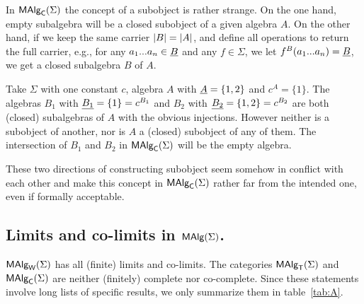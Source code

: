 \documentclass[10pt]{article}
\begin{document}
In $\mbox{\rm\sf MAlg}_{\sf C}(\Sigma)$ the concept of a subobject is rather strange.  
On the one hand, empty subalgebra will be a
closed subobject of a given algebra $A$. On the other hand, if we keep
the same carrier $|B|=|A|$, and define all operations to
return the full carrier, e.g., for any $a_{1}...a_{n}\in\underline {B}$
and any $f\in\Sigma$, we let $f^B(a_{1}...a_{n})=\underline {B}$, we
get a closed subalgebra $B$ of $A$.



\begin{Example}
\label{ex:nointersect}
Take $\Sigma$ with one constant $c$, algebra $A$ with $\underline {A}=\{1,2\}$ and $c^A=\{1\}$.  The algebras $B_1$ with
$\underline {B_1}=\{1\}=c^{B_{1}}$ and $B_2$ with
$\underline {B_2}=\{1,2\}=c^{B_{2}}$ are both (closed) subalgebras of $A$
with the obvious injections. However neither is a subobject of
another, nor is $A$ a (closed) subobject of any of them. %
The
intersection of $B_1$ and $B_2$ in $\mbox{\rm\sf MAlg}_{\sf C}(\Sigma)$ will be the empty algebra.
\end{Example}

\noindent
These two directions of constructing subobject seem somehow in conflict 
with each other and make
this concept in $\mbox{\rm\sf MAlg}_{\sf C}(\Sigma)$ rather far from the intended
one, even if formally acceptable.

\subsection{Limits and co-limits in $\mbox{\rm\sf MAlg}(\Sigma)$.}
\label{sub:limit}

$\mbox{\rm\sf MAlg}_{\sf W}(\Sigma)$ has all (finite) limits and co-limits. The categories $\mbox{\rm\sf MAlg}_{\sf T}(\Sigma)$
and $\mbox{\rm\sf MAlg}_{\sf C}(\Sigma)$ are neither (finitely) complete nor co-complete. Since
these statements involve long lists of specific results, we only
summarize them in table~\ref{tab:A}.
\end{document}

